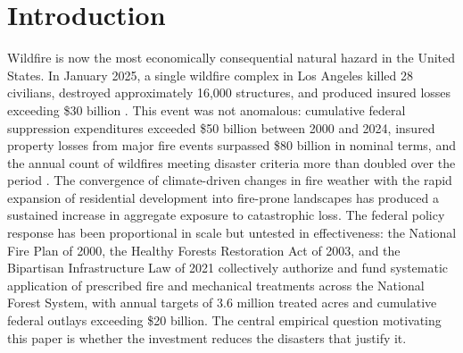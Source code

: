 \documentclass[12pt, letterpaper]{article}
\begin{document}
\begin{abstract}
scale and documents the identification challenges that future causal evaluations must address.

\bigskip
\noindent \textit{JEL classification:} Q23, Q54, Q58, H54, C23, R52

\noindent \textit{Keywords:} wildfire; fuel reduction treatments; wildland-urban interface; disaster mitigation; propensity score matching; difference-in-differences; long-differences; Bartik instrument; welfare analysis
\end{abstract}

\newpage
\setcounter{page}{1}

\section{Introduction}

Wildfire is now the most economically consequential natural hazard in the United States. In January 2025, a single wildfire complex in Los Angeles killed 28 civilians, destroyed approximately 16,000 structures, and produced insured losses exceeding \$30 billion \citep{phillips2025}. This event was not anomalous: cumulative federal suppression expenditures exceeded \$50 billion between 2000 and 2024, insured property losses from major fire events surpassed \$80 billion in nominal terms, and the annual count of wildfires meeting disaster criteria more than doubled over the period \citep{calkin2005, baylis2023}. The convergence of climate-driven changes in fire weather \citep{westerling2006, abatzoglou2016, brown2023} with the rapid expansion of residential development into fire-prone landscapes \citep{radeloff2018, chen2024} has produced a sustained increase in aggregate exposure to catastrophic loss. The federal policy response has been proportional in scale but untested in effectiveness: the National Fire Plan of 2000, the Healthy Forests Restoration Act of 2003, and the Bipartisan Infrastructure Law of 2021 collectively authorize and fund systematic application of prescribed fire and mechanical treatments across the National Forest System, with annual targets of 3.6 million treated acres and cumulative federal outlays exceeding \$20 billion. The central empirical question motivating this paper is whether the investment reduces the disasters that justify it.
\end{document}
